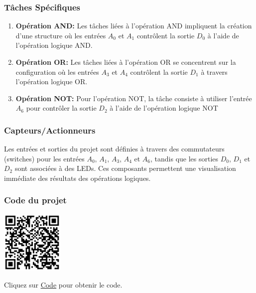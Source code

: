 \documentclass[a4paper,12pt]{report}
\begin{document}
\subsubsection{Tâches Spécifiques}

\begin{enumerate}
    \item \textbf{Opération AND:} Les tâches liées à l'opération AND impliquent la création d'une structure où les entrées \(A_0\) et \(A_1\) contrôlent la sortie \(D_0\) à l'aide de l'opération logique AND.
    
    \item \textbf{Opération OR:} Les tâches liées à l'opération OR se concentrent sur la configuration où les entrées \(A_3\) et \(A_4\) contrôlent la sortie \(D_1\) à travers l'opération logique OR.
    
    \item \textbf{Opération NOT:} Pour l'opération NOT, la tâche consiste à utiliser l'entrée \(A_6\) pour contrôler la sortie \(D_2\) à l'aide de l'opération logique NOT
\end{enumerate}

\subsubsection{Capteurs/Actionneurs}
Les entrées et sorties du projet sont définies à travers des commutateurs (switches) pour les entrées \(A_0\), \(A_1\), \(A_3\), \(A_4\) et \(A_6\), tandis que les sorties \(D_0\), \(D_1\) et \(D_2\) sont associées à des LEDs. Ces composants permettent une visualisation immédiate des résultats des opérations logiques.

\subsubsection{Code du projet}

\begin{minipage}{0.5\textwidth}
    \includegraphics[height=3cm]{Code TC100.png}
\end{minipage}%
\begin{minipage}{0.5\textwidth}
    Cliquez sur \href{https://github.com/DexterTaha/Controllino-PLC-Sample/blob/main/TC100/TC100_ET_OU_NON/TC100_ET_OU_NON.ino}{Code} pour obtenir le code.
\end{minipage}
\end{document}
